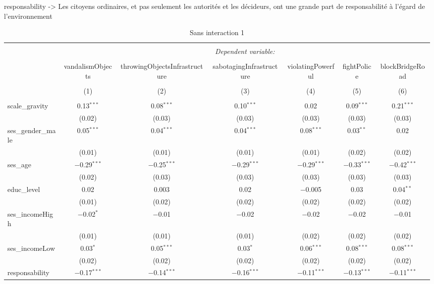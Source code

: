 \documentclass[
]{article}
\author{}
\date{\vspace{-2.5em}}
\begin{document}
responsability -\textgreater{} Les citoyens ordinaires, et pas seulement
les autorités et les décideurs, ont une grande part de responsabilité à
l'égard de l'environnement

\begin{sidewaystable}[!htbp] \centering 
  \caption{Sans interaction 1} 
  \label{} 
\begin{tabular}{@{\extracolsep{1pt}}lcccccc} 
\\[-1.8ex]\hline 
\hline \\[-1.8ex] 
 & \multicolumn{6}{c}{\textit{Dependent variable:}} \\ 
\cline{2-7} 
\\[-1.8ex] & vandalismObjects & throwingObjectsInfrastructure & sabotagingInfrastructure & violatingPowerful & fightPolice & blockBridgeRoad \\ 
\\[-1.8ex] & (1) & (2) & (3) & (4) & (5) & (6)\\ 
\hline \\[-1.8ex] 
 scale\_gravity & 0.13$^{***}$ & 0.08$^{***}$ & 0.10$^{***}$ & 0.02 & 0.09$^{***}$ & 0.21$^{***}$ \\ 
  & (0.02) & (0.03) & (0.03) & (0.03) & (0.03) & (0.03) \\ 
  ses\_gender\_male & 0.05$^{***}$ & 0.04$^{***}$ & 0.04$^{***}$ & 0.08$^{***}$ & 0.03$^{**}$ & 0.02 \\ 
  & (0.01) & (0.01) & (0.01) & (0.01) & (0.02) & (0.02) \\ 
  ses\_age & $-$0.29$^{***}$ & $-$0.25$^{***}$ & $-$0.29$^{***}$ & $-$0.29$^{***}$ & $-$0.33$^{***}$ & $-$0.42$^{***}$ \\ 
  & (0.02) & (0.03) & (0.03) & (0.03) & (0.03) & (0.03) \\ 
  educ\_level & 0.02 & 0.003 & 0.02 & $-$0.005 & 0.03 & 0.04$^{**}$ \\ 
  & (0.01) & (0.02) & (0.02) & (0.02) & (0.02) & (0.02) \\ 
  ses\_incomeHigh & $-$0.02$^{*}$ & $-$0.01 & $-$0.02 & $-$0.02 & $-$0.02 & $-$0.01 \\ 
  & (0.01) & (0.01) & (0.01) & (0.02) & (0.02) & (0.02) \\ 
  ses\_incomeLow & 0.03$^{*}$ & 0.05$^{***}$ & 0.03$^{*}$ & 0.06$^{***}$ & 0.08$^{***}$ & 0.08$^{***}$ \\ 
  & (0.02) & (0.02) & (0.02) & (0.02) & (0.02) & (0.02) \\ 
  responsability & $-$0.17$^{***}$ & $-$0.14$^{***}$ & $-$0.16$^{***}$ & $-$0.11$^{***}$ & $-$0.13$^{***}$ & $-$0.11$^{***}$ \\ 

\end{tabular}
\end{sidewaystable}
\end{document}
